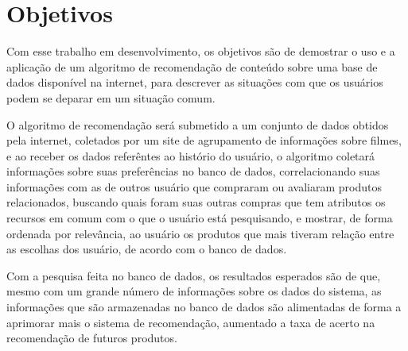 \documentclass[12pt,
				openright,
				twoside,
				a4paper,
				apter=TITLE,
				section=TITLE,
				subsection=TITLE,
				chapter=TITLE,
				english,
				brazil]{abntex2}
\begin{document}
\section{Objetivos}
Com esse trabalho em desenvolvimento, os objetivos são de demostrar o uso e a aplicação de um algoritmo de recomendação de conteúdo sobre uma base de dados disponível na internet, para descrever as situações com que os usuários podem se deparar em um situação comum.

O algoritmo de recomendação será submetido a um conjunto de dados obtidos pela internet, coletados por um site  de agrupamento de informações sobre filmes, e ao receber os dados referêntes ao histório do usuário, o algoritmo coletará informações sobre suas preferências no banco de dados, correlacionando suas  informações com as de outros usuário que compraram ou avaliaram produtos relacionados, buscando quais foram suas outras  compras que tem atributos os recursos em comum com o que o usuário está pesquisando, e mostrar, de forma ordenada por relevância, ao  usuário os produtos que mais tiveram relação entre as escolhas dos usuário, de acordo com o banco de dados.

Com a pesquisa feita no banco de dados, os resultados esperados são de que, mesmo com um grande número de informações sobre os dados do sistema, as informações que são armazenadas no banco de dados são alimentadas de forma a aprimorar mais 
o sistema de recomendação, aumentado a taxa de acerto na recomendação de futuros produtos.
\end{document}
